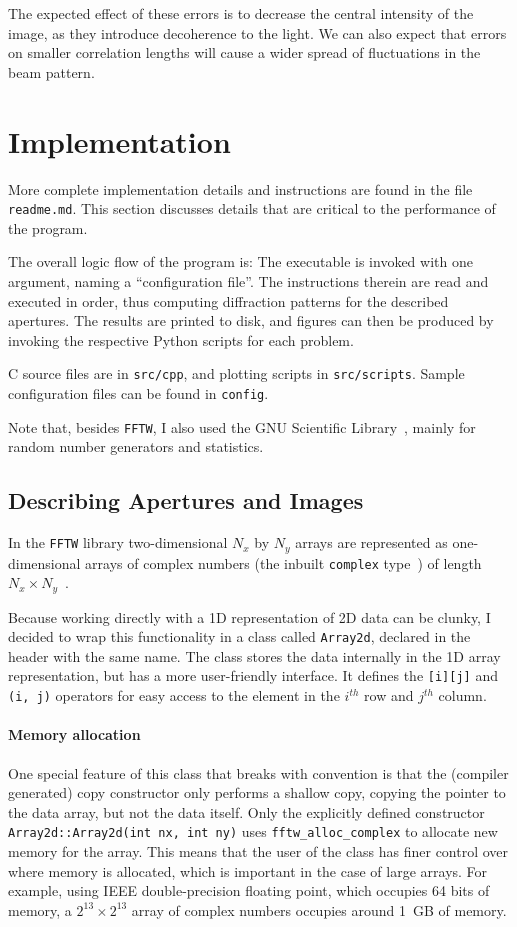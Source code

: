 \documentclass{article}
\newcommand{\CC}{{C\nolinebreak[4]\hspace{-.05em}\raisebox{.3ex}{\scriptsize\bf ++}}}
\begin{document}
The expected effect of these errors is to decrease the central intensity of the image, as they introduce decoherence to the light. We can also expect that errors on smaller correlation lengths will cause a wider spread of fluctuations in the beam pattern.

\section{Implementation}\label{sec:impl}
More complete implementation details and instructions are found in the file \texttt{readme.md}. This section discusses details that are critical to the performance of the program.

The overall logic flow of the program is:
The executable is invoked with one argument, naming a ``configuration file''. The instructions therein are read and executed in order, thus computing diffraction patterns for the described apertures. The results are printed to disk, and figures can then be produced by invoking the respective Python scripts for each problem.

\CC{} source files are in \texttt{src/cpp}, and plotting scripts in \texttt{src/scripts}. Sample configuration files can be found in \texttt{config}.

Note that, besides \texttt{FFTW}, I also used the GNU Scientific Library~\cite{gsl}, mainly for random number generators and statistics.

\subsection{Describing Apertures and Images}
In the \texttt{FFTW} library two-dimensional $N_x$ by $N_y$ arrays are represented as one-dimensional arrays of complex numbers (the inbuilt \texttt{complex} type~\cite{cppcomplex}) of length $N_x \times N_y$~\cite[Section 3.2]{fftw}.

Because working directly with a 1D representation of 2D data can be clunky, I decided to wrap this functionality in a class called \texttt{Array2d}, declared in the header with the same name. The class stores the data internally in the 1D array representation, but has a more user-friendly interface. It defines the \texttt{[i][j]} and \texttt{(i, j)} operators for easy access to the element in the $i^{th}$ row and $j^{th}$ column.

\paragraph{Memory allocation} One special feature of this class that breaks with convention is that the (compiler generated) copy constructor only performs a shallow copy, copying the pointer to the data array, but not the data itself. Only the explicitly defined constructor \texttt{Array2d::Array2d(int nx, int ny)} uses \texttt{fftw\_alloc\_complex} to allocate new memory for the array. This means that the user of the class has finer control over where memory is allocated, which is important in the case of large arrays. For example, using IEEE double-precision floating point, which occupies 64 bits of memory, a $2^{13} \times 2^{13}$ array of complex numbers occupies around \SI{1}{GB} of memory.
\end{document}

